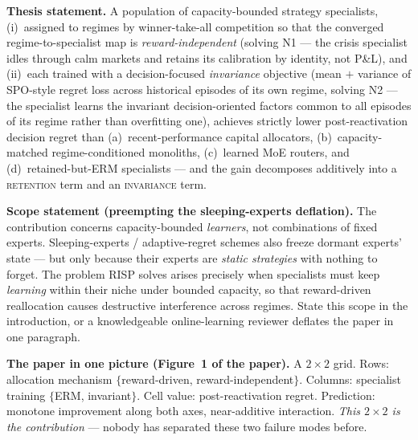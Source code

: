 \documentclass[11pt]{article}
\newcommand{\risp}{\textsc{RISP}}
\begin{document}
\noindent\textbf{Thesis statement.} A population of capacity-bounded strategy specialists, (i)~assigned to regimes by winner-take-all competition so that the converged regime-to-specialist map is \emph{reward-independent} (solving N1 --- the crisis specialist idles through calm markets and retains its calibration by identity, not P\&L), and (ii)~each trained with a decision-focused \emph{invariance} objective (mean $+$ variance of SPO-style regret loss across historical episodes of its own regime, solving N2 --- the specialist learns the invariant decision-oriented factors common to all episodes of its regime rather than overfitting one), achieves strictly lower post-reactivation decision regret than (a)~recent-performance capital allocators, (b)~capacity-matched regime-conditioned monoliths, (c)~learned MoE routers, and (d)~retained-but-ERM specialists --- and the gain decomposes additively into a \textsc{retention} term and an \textsc{invariance} term.

\medskip\noindent\textbf{Scope statement (preempting the sleeping-experts deflation).} The contribution concerns capacity-bounded \emph{learners}, not combinations of fixed experts. Sleeping-experts / adaptive-regret schemes also freeze dormant experts' state --- but only because their experts are \emph{static strategies} with nothing to forget. The problem \risp{} solves arises precisely when specialists must keep \emph{learning} within their niche under bounded capacity, so that reward-driven reallocation causes destructive interference across regimes. State this scope in the introduction, or a knowledgeable online-learning reviewer deflates the paper in one paragraph.

\medskip\noindent\textbf{The paper in one picture (Figure~1 of the paper).} A $2\times2$ grid. Rows: allocation mechanism $\{$reward-driven, reward-independent$\}$. Columns: specialist training $\{$ERM, invariant$\}$. Cell value: post-reactivation regret. Prediction: monotone improvement along both axes, near-additive interaction. \emph{This $2\times2$ is the contribution} --- nobody has separated these two failure modes before.
\end{document}
